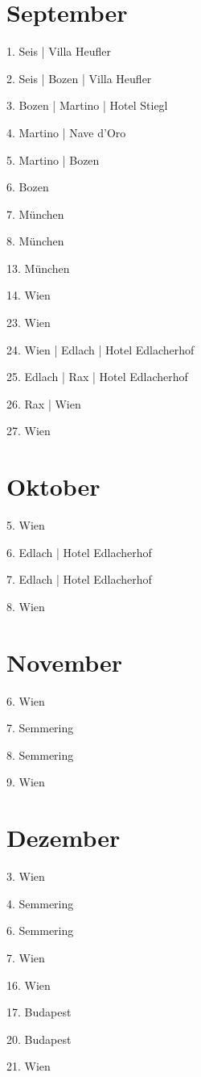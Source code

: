 \documentclass[twoside=false,titlepage=false,open=any, parskip=never, fontsize=10pt, headings=small, chapterprefix=false, appendixprefix=false, DIV=15]{scrbook}
\begin{document}
\begin{multicols}{3}
            \section*{September}
            1. Seis | Villa Heufler\par
            2. Seis | Bozen | Villa Heufler\par
            3. Bozen | Martino | Hotel Stiegl\par
            4. Martino | Nave d’Oro\par
            5. Martino | Bozen\par
            6. Bozen\par
            7. München\par
            8. München\par
            13. München\par
            14. Wien\par
            23. Wien\par
            24. Wien | Edlach | Hotel Edlacherhof\par
            25. Edlach | Rax | Hotel Edlacherhof\par
            26. Rax | Wien\par
            27. Wien\par
            \section*{Oktober}
            5. Wien\par
            6. Edlach | Hotel Edlacherhof\par
            7. Edlach | Hotel Edlacherhof\par
            8. Wien\par
            \section*{November}
            6. Wien\par
            7. Semmering\par
            8. Semmering\par
            9. Wien\par
            \section*{Dezember}
            3. Wien\par
            4. Semmering\par
            6. Semmering\par
            7. Wien\par
            16. Wien\par
            17. Budapest\par
            20. Budapest\par
            21. Wien\par

\end{multicols}
\end{document}
